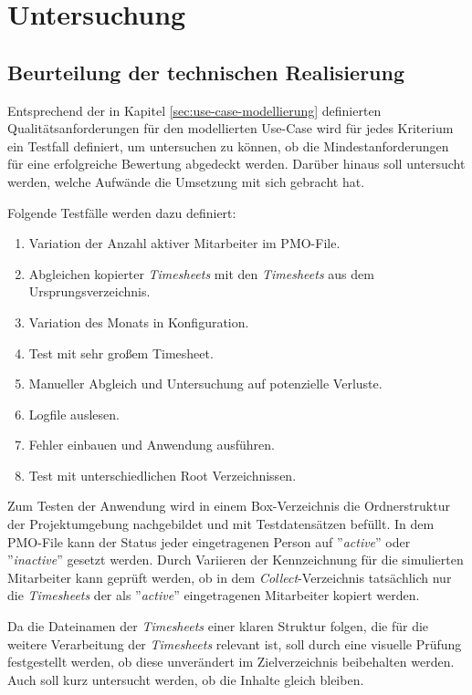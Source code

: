 \chapter{Untersuchung}

\section{Beurteilung der technischen Realisierung}
Entsprechend der in Kapitel \ref{sec:use-case-modellierung} definierten Qualitätsanforderungen für den modellierten Use-Case wird für jedes Kriterium ein Testfall definiert, um untersuchen zu können, ob die Mindestanforderungen für eine erfolgreiche Bewertung abgedeckt werden. Darüber hinaus soll untersucht werden, welche Aufwände die Umsetzung mit sich gebracht hat.

Folgende Testfälle werden dazu definiert:
\begin{enumerate}
    \item Variation der Anzahl aktiver Mitarbeiter im PMO-File.
    \item Abgleichen kopierter \textit{\glspl{Timesheet}} mit den \textit{\glspl{Timesheet}} aus dem Ursprungsverzeichnis.
    \item Variation des Monats in Konfiguration.
    \item Test mit sehr großem Timesheet.
    \item Manueller Abgleich und Untersuchung auf potenzielle Verluste.
    \item Logfile auslesen.
    \item Fehler einbauen und Anwendung ausführen.
    \item Test mit unterschiedlichen Root Verzeichnissen.
\end{enumerate}

Zum Testen der Anwendung wird in einem \gls{Box}-Verzeichnis die Ordnerstruktur der Projektumgebung nachgebildet und mit Testdatensätzen befüllt. In dem PMO-File kann der Status jeder eingetragenen Person auf ''\textit{active}'' oder ''\textit{inactive}'' gesetzt werden. Durch Variieren der Kennzeichnung für die simulierten Mitarbeiter kann geprüft werden, ob in dem \textit{Collect}-Verzeichnis tatsächlich nur die \textit{\glspl{Timesheet}} der als ''\textit{active}'' eingetragenen Mitarbeiter kopiert werden.

Da die Dateinamen der \textit{\glspl{Timesheet}} einer klaren Struktur folgen, die für die weitere Verarbeitung der \textit{\glspl{Timesheet}} relevant ist, soll durch eine visuelle Prüfung festgestellt werden, ob diese unverändert im Zielverzeichnis beibehalten werden. Auch soll kurz untersucht werden, ob die Inhalte gleich bleiben.

